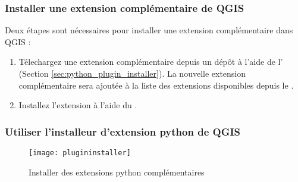 \subsubsection{Installer une extension complémentaire de QGIS}\label{sec:load_external_plugin} 

Deux étapes sont nécessaires pour installer une extension complémentaire dans QGIS :

\begin{enumerate}
\item Télechargez une extension complémentaire depuis un dépôt à l'aide de l' (Section \ref{sec:python_plugin_installer}).
La nouvelle extension complémentaire sera ajoutée à la liste des extensions disponibles depuis le .
\item Installez l'extension à l'aide du .
\end{enumerate}

\subsubsection{Utiliser l'installeur d'extension python de QGIS}\label{sec:python_plugin_installer}

\begin{figure}[ht]
   \begin{center}
   \caption{Installer des extensions python complémentaires\nixcaption}
\label{fig:plugininstaller}\smallskip
   \texttt{[image: plugininstaller]}
\end{center}
\end{figure}

